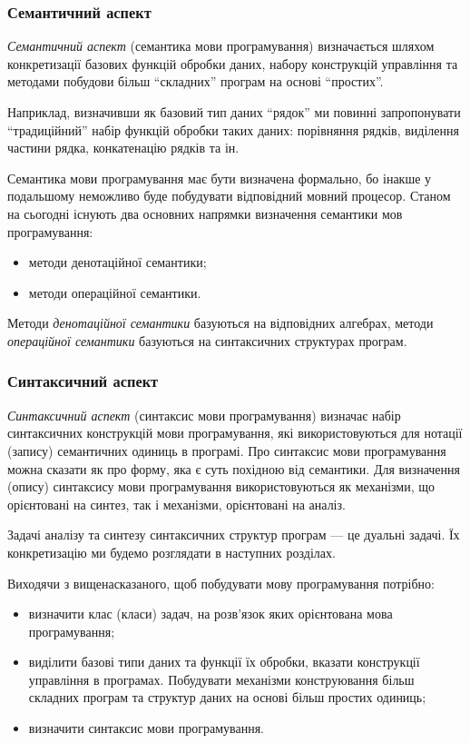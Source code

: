 \subsubsection{Семантичний аспект}

\textit{Семантичний аспект} (семантика мови програмування) визначається
шляхом конкретизації базових функцій обробки даних, набору конструкцій
управління та методами побудови більш ``складних'' програм на основі ``простих''. \medskip

Наприклад, визначивши як базовий тип даних ``рядок'' ми повинні
запропонувати ``традиційний'' набір функцій обробки таких даних: порівняння
рядків, виділення частини рядка, конкатенацію рядків та ін.  \medskip

Семантика мови програмування має бути визначена формально, бо інакше у
подальшому неможливо буде побудувати відповідний мовний процесор. Станом на
сьогодні існують два основних напрямки визначення семантики мов
програмування: 
\begin{itemize}
	\item методи денотаційної семантики;
	\item методи операційної семантики.
\end{itemize}

Методи \textit{денотаційної семантики} базуються на відповідних алгебрах, методи
\textit{операційної семантики} базуються на синтаксичних структурах програм.

\subsubsection{Синтаксичний аспект}

\textit{Синтаксичний аспект} (синтаксис мови програмування) визначає набір
синтаксичних конструкцій мови програмування, які використовуються для нотації
(запису) семантичних одиниць в програмі. Про синтаксис мови програмування
можна сказати як про форму, яка є суть похідною від семантики. Для визначення
(опису) синтаксису мови програмування використовуються як механізми, що
орієнтовані на синтез, так і механізми, орієнтовані на аналіз. \medskip

Задачі аналізу та синтезу синтаксичних структур програм --- це дуальні задачі. 
Їх конкретизацію ми будемо розглядати в наступних розділах.  \medskip

Виходячи з вищенасказаного, щоб побудувати мову програмування потрібно:
\begin{itemize}
	\item визначити клас (класи) задач, на розв'язок яких орієнтована мова 
	програмування;
	\item виділити базові типи даних та функції їх обробки, вказати конструкції
	управління в програмах. Побудувати механізми конструювання більш складних
	програм та структур даних на основі більш простих одиниць;
	\item визначити синтаксис мови програмування.
\end{itemize}

